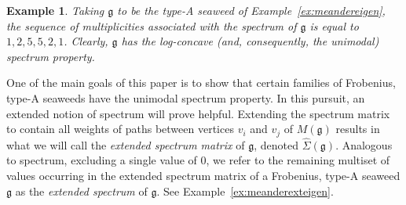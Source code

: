 \documentclass[letterpaper,10pt]{article}
\newtheorem{Ex}[theorem]{Example}
\begin{document}
\begin{Ex}
    Taking $\mathfrak{g}$ to be the type-A seaweed of Example~\ref{ex:meandereigen}, the sequence of multiplicities associated with the spectrum of $\mathfrak{g}$ is equal to $1,2,5,5,2,1$. Clearly, $\mathfrak{g}$ has the log-concave \textup(and, consequently, the unimodal\textup) spectrum property.
\end{Ex}


One of the main goals of this paper is to show that certain families of Frobenius, type-A seaweeds have the unimodal spectrum property. In this pursuit, an extended notion of spectrum will prove helpful. Extending the spectrum matrix to contain all weights of paths between vertices $v_i$ and $v_j$ of $M(\mathfrak{g})$ results in what we will call the \textit{extended spectrum matrix} of $\mathfrak{g}$, denoted $\widehat{\Sigma}(\mathfrak{g})$. Analogous to spectrum, excluding a single value of 0, we refer to the remaining multiset of values occurring in the extended spectrum matrix of a Frobenius, type-A seaweed $\mathfrak{g}$ as the \textit{extended spectrum} of $\mathfrak{g}$. See Example~\ref{ex:meanderexteigen}.
\end{document}
